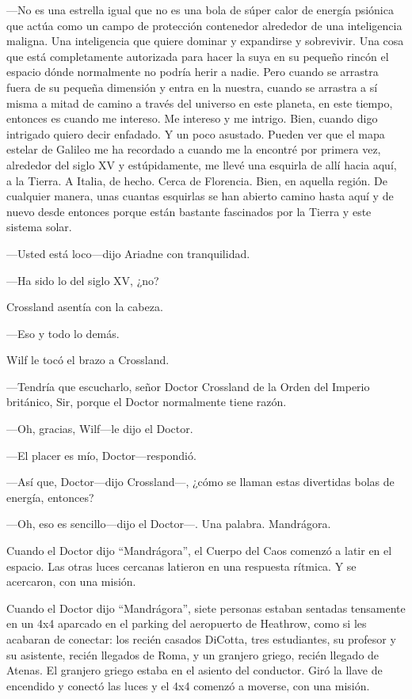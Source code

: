 ---No es una estrella igual que no es una bola de súper calor de energía
psiónica que actúa como un campo de protección contenedor alrededor de
una inteligencia maligna. Una inteligencia que quiere dominar y
expandirse y sobrevivir. Una cosa que está completamente autorizada para
hacer la suya en su pequeño rincón el espacio dónde normalmente no
podría herir a nadie. Pero cuando se arrastra fuera de su pequeña
dimensión y entra en la nuestra, cuando se arrastra a sí misma a mitad
de camino a través del universo en este planeta, en este tiempo,
entonces es cuando me intereso. Me intereso y me intrigo. Bien, cuando
digo intrigado quiero decir enfadado. Y un poco asustado. Pueden ver que
el mapa estelar de Galileo me ha recordado a cuando me la encontré por
primera vez, alrededor del siglo XV y estúpidamente, me llevé una
esquirla de allí hacia aquí, a la Tierra. A Italia, de hecho. Cerca de
Florencia. Bien, en aquella región. De cualquier manera, unas cuantas
esquirlas se han abierto camino hasta aquí y de nuevo desde entonces
porque están bastante fascinados por la Tierra y este sistema solar.

---Usted está loco---dijo Ariadne con tranquilidad.

---Ha sido lo del siglo XV, ¿no?

Crossland asentía con la cabeza.

---Eso y todo lo demás.

Wilf le tocó el brazo a Crossland.

---Tendría que escucharlo, señor Doctor Crossland de la Orden del
Imperio británico, Sir, porque el Doctor normalmente tiene razón.

---Oh, gracias, Wilf---le dijo el Doctor.

---El placer es mío, Doctor---respondió.

---Así que, Doctor---dijo Crossland---, ¿cómo se llaman estas divertidas
bolas de energía, entonces?

---Oh, eso es sencillo---dijo el Doctor---. Una palabra. Mandrágora.

Cuando el Doctor dijo ``Mandrágora'', el Cuerpo del Caos comenzó a latir
en el espacio. Las otras luces cercanas latieron en una respuesta
rítmica. Y se acercaron, con una misión.

Cuando el Doctor dijo ``Mandrágora'', siete personas estaban sentadas
tensamente en un 4x4 aparcado en el parking del aeropuerto de Heathrow,
como si les acabaran de conectar: los recién casados DiCotta, tres
estudiantes, su profesor y su asistente, recién llegados de Roma, y un
granjero griego, recién llegado de Atenas. El granjero griego estaba en
el asiento del conductor. Giró la llave de encendido y conectó las luces
y el 4x4 comenzó a moverse, con una misión.

